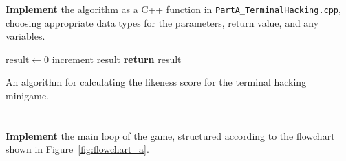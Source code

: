 \textbf{Implement} the algorithm as a C++ function in \texttt{PartA\_TerminalHacking.cpp}, choosing appropriate data types for the parameters, return value, and any variables.

\begin{algorithm}[t]
\begin{algorithmic}
        \State $\text{result} \gets 0$
                \State increment result
            \EndIf
        \EndFor
        \State \textbf{return} result
    \EndProcedure
\end{algorithmic}
\caption{An algorithm for calculating the likeness score for the terminal hacking minigame.}
\label{alg:a_likeness}
\end{algorithm}

\section{} \label{core-a-last}

\textbf{Implement} the main loop of the game, structured
according to the flowchart shown in Figure~\ref{fig:flowchart_a}.

